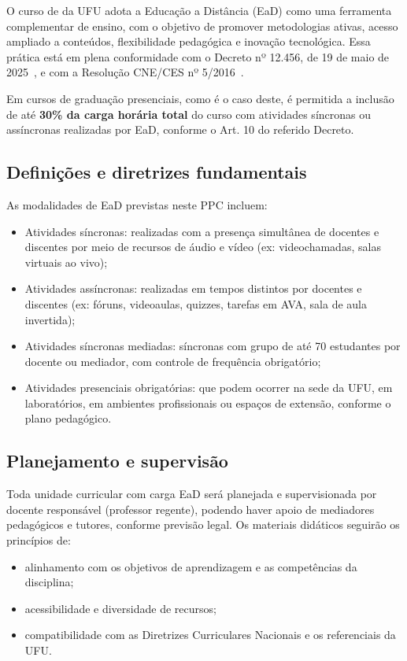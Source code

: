 O curso de \ppccurso da UFU adota a Educação a Distância (EaD) como uma ferramenta complementar de ensino, com o objetivo de promover metodologias ativas, acesso ampliado a conteúdos, flexibilidade pedagógica e inovação tecnológica. Essa prática está em plena conformidade com o Decreto nº 12.456, de 19 de maio de 2025~\cite{Decreto:12456:2025}, e com a Resolução CNE/CES nº 5/2016~\cite{MEC:CNE:CES:5:2016}.

Em cursos de graduação presenciais, como é o caso deste, é permitida a inclusão de até \textbf{30\% da carga horária total} do curso com atividades síncronas ou assíncronas realizadas por EaD, conforme o Art. 10 do referido Decreto.

\subsection{Definições e diretrizes fundamentais}

As modalidades de EaD previstas neste PPC incluem:

\begin{itemize}
    \item Atividades síncronas: realizadas com a presença simultânea de docentes e discentes por meio de recursos de áudio e vídeo (ex: videochamadas, salas virtuais ao vivo);
    \item Atividades assíncronas: realizadas em tempos distintos por docentes e discentes (ex: fóruns, videoaulas, quizzes, tarefas em AVA, sala de aula invertida);
    \item Atividades síncronas mediadas: síncronas com grupo de até 70 estudantes por docente ou mediador, com controle de frequência obrigatório;
    \item Atividades presenciais obrigatórias: que podem ocorrer na sede da UFU, em laboratórios, em ambientes profissionais ou espaços de extensão, conforme o plano pedagógico.
\end{itemize}

\subsection{Planejamento e supervisão}
\label{sec:planejamento_ead}

Toda unidade curricular com carga EaD será planejada e supervisionada por docente responsável (professor regente), podendo haver apoio de mediadores pedagógicos e tutores, conforme previsão legal. Os materiais didáticos seguirão os princípios de:
\begin{itemize}
    \item alinhamento com os objetivos de aprendizagem e as competências da disciplina;
    \item acessibilidade e diversidade de recursos;
    \item compatibilidade com as Diretrizes Curriculares Nacionais e os referenciais da UFU.
\end{itemize}

